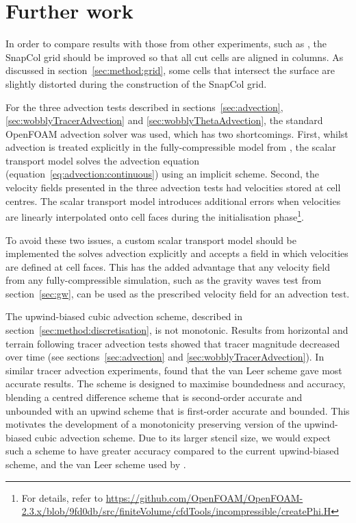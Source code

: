 \chapter{Further work}

In order to compare results with those from other experiments, such as \textcite{good2013}, the SnapCol grid should be improved so that all cut cells are aligned in columns.  As discussed in section~\ref{sec:method:grid}, some cells that intersect the surface are slightly distorted during the construction of the SnapCol grid.

For the three advection tests described in sections~\ref{sec:advection}, \ref{sec:wobblyTracerAdvection} and \ref{sec:wobblyThetaAdvection}, the standard OpenFOAM advection solver was used, which has two shortcomings.  First, whilst advection is treated explicitly in the fully-compressible model from \textcite{weller-shahrokhi2014}, the scalar transport model solves the advection equation (equation~\ref{eq:advection:continuous}) using an implicit scheme.  Second, the velocity fields presented in the three advection tests had velocities stored at cell centres.  The scalar transport model introduces additional errors when velocities are linearly interpolated onto cell faces during the initialisation phase\footnote{For details, refer to \url{https://github.com/OpenFOAM/OpenFOAM-2.3.x/blob/9fd0db/src/finiteVolume/cfdTools/incompressible/createPhi.H}}.

To avoid these two issues, a custom scalar transport model should be implemented the solves advection explicitly and accepts a field in which velocities are defined at cell faces.  This has the added advantage that any velocity field from any fully-compressible simulation, such as the gravity waves test from section~\ref{sec:gw}, can be used as the prescribed velocity field for an advection test.

The upwind-biased cubic advection scheme, described in section~\ref{sec:method:discretisation}, is not monotonic.  Results from horizontal and terrain following tracer advection tests showed that tracer magnitude decreased over time (see sections~\ref{sec:advection} and \ref{sec:wobblyTracerAdvection}).
In similar tracer advection experiments, \textcite{jones2013} found that the van Leer scheme gave most accurate results.  The scheme is designed to maximise boundedness and accuracy, blending a centred difference scheme that is second-order accurate and unbounded with an upwind scheme that is first-order accurate and bounded.  This motivates the development of a monotonicity preserving version of the upwind-biased cubic advection scheme.  Due to its larger stencil size, we would expect such a scheme to have greater accuracy compared to the current upwind-biased scheme, and the van Leer scheme used by \textcite{jones2013}.

